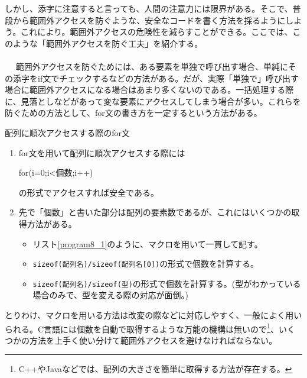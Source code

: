 しかし、添字に注意すると言っても、人間の注意力には限界がある。そこで、普段から範囲外アクセスを防ぐような、安全なコードを書く方法を採るようにしよう。これにより。範囲外アクセスの危険性を減らすことができる。ここでは、このような「範囲外アクセスを防ぐ工夫」を紹介する。
\\ \\　
範囲外アクセスを防ぐためには、ある要素を単独で呼び出す場合、単純にその添字をif文でチェックするなどの方法がある。だが、実際「単独で」呼び出す場合に範囲外アクセスになる場合はあまり多くないのである。一括処理する際に、見落としなどがあって変な要素にアクセスしてしまう場合が多い。これらを防ぐための方法として、for文の書き方を一定するという方法がある。
\begin{itembox}[l]{配列に順次アクセスする際のfor文}
\begin{enumerate}
\item for文を用いて配列に順次アクセスする際には
\begin{code}
for(i=0;i<個数;i++)
\end{code}
の形式でアクセスすれば安全である。
\item 先で「個数」と書いた部分は配列の要素数であるが、これにはいくつかの取得方法がある。
\begin{itemize}
\item リスト\ref{program8_1}のように、マクロを用いて一貫して記す。
\item \verb|sizeof(配列名)/sizeof(配列名[0])|の形式で個数を計算する。
\item \verb|sizeof(配列名)/sizeof(型)|の形式で個数を計算する。(型がわかっている場合のみで、型を変える際の対応が面倒。)
\end{itemize}
\end{enumerate}
\end{itembox}

とりわけ、マクロを用いる方法は改変の際などに対応しやすく、一般によく用いられる。C言語には個数を自動で取得するような万能の機構は無いので\footnote{C++やJavaなどでは、配列の大きさを簡単に取得する方法が存在する。}、いくつかの方法を上手く使い分けて範囲外アクセスを避けなければならない。

